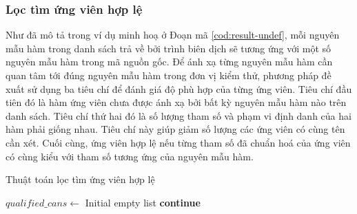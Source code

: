 \subsubsection*{Lọc tìm ứng viên hợp lệ}
Như đã mô tả trong ví dụ minh hoạ ở Đoạn mã \ref{cod:result-undef}, mỗi nguyên mẫu hàm trong danh sách trả về bởi trình biên dịch sẽ tương ứng với một số nguyên mẫu hàm trong mã nguồn gốc. Để ánh xạ từng nguyên mẫu hàm cần quan tâm tới đúng nguyên mẫu hàm trong đơn vị kiểm thử, phương pháp đề xuất sử dụng ba tiêu chí để đánh giá độ phù hợp của từng ứng viên. Tiêu chí đầu tiên đó là hàm ứng viên chưa được ánh xạ bởi bất kỳ nguyên mẫu hàm nào trên danh sách. Tiêu chí thứ hai đó là số lượng tham số và phạm vi định danh của hai hàm phải giống nhau. Tiêu chí này giúp giảm số lượng các ứng viên có cùng tên cần xét. Cuối cùng, ứng viên hợp lệ nếu từng tham số đã chuẩn hoá của ứng viên có cùng kiểu với tham số tương ứng của nguyên mẫu hàm.
\begin{algorithm}
    \small
    \caption{Thuật toán lọc tìm ứng viên hợp lệ}
    \label{alg:filter-undef}
					
    $qualified\_cans \leftarrow$ Initial empty list\;
     {
         {
            \textbf{continue}
        }
    }
\end{algorithm}

